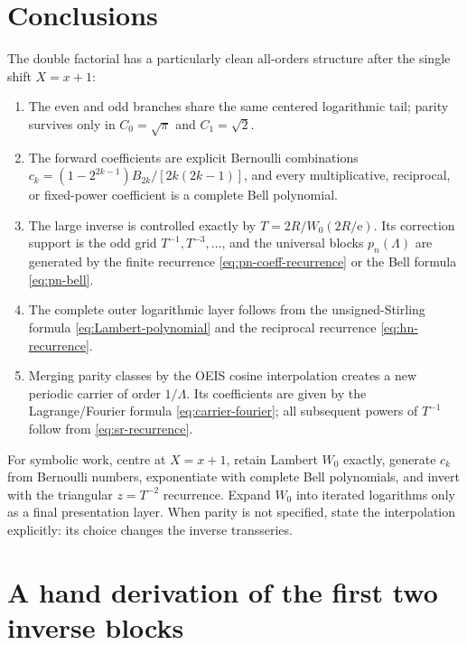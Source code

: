 \documentclass[11pt,oneside]{article}
\theoremstyle{plain}
\theoremstyle{definition}
\theoremstyle{remark}
\newcommand{\e}{\mathrm e}
\begin{document}
\section{Conclusions}
\label{sec:conclusions}

The double factorial has a particularly clean all-orders structure after the
single shift \(X=x+1\):
\begin{enumerate}
\item The even and odd branches share the same centered logarithmic tail;
      parity survives only in \(C_0=\sqrt\pi\) and \(C_1=\sqrt2\).
\item The forward coefficients are explicit Bernoulli combinations
      \(c_k=(1-2^{2k-1})B_{2k}/[2k(2k-1)]\), and every multiplicative,
      reciprocal, or fixed-power coefficient is a complete Bell polynomial.
\item The large inverse is controlled exactly by
      \(T=2R/W_0(2R/\e)\).  Its correction support is the odd grid
      \(T^{-1},T^{-3},\ldots\), and the universal blocks
      \(p_n(\Lambda)\) are generated by the finite recurrence
      \cref{eq:pn-coeff-recurrence} or the Bell formula
      \cref{eq:pn-bell}.
\item The complete outer logarithmic layer follows from the unsigned-Stirling
      formula \cref{eq:Lambert-polynomial} and the reciprocal recurrence
      \cref{eq:hn-recurrence}.
\item Merging parity classes by the OEIS cosine interpolation creates a new
      periodic carrier of order \(1/\Lambda\).  Its coefficients are given by
      the Lagrange/Fourier formula \cref{eq:carrier-fourier}; all subsequent
      powers of \(T^{-1}\) follow from \cref{eq:sr-recurrence}.
\end{enumerate}

\begin{summarybox}
For symbolic work, centre at \(X=x+1\), retain Lambert \(W_0\) exactly, generate
\(c_k\) from Bernoulli numbers, exponentiate with complete Bell polynomials,
and invert with the triangular \(z=T^{-2}\) recurrence.  Expand \(W_0\) into
iterated logarithms only as a final presentation layer.  When parity is not
specified, state the interpolation explicitly: its choice changes the inverse
transseries.
\end{summarybox}

\appendix

\section{A hand derivation of the first two inverse blocks}
\label{app:hand-blocks}
\end{document}

